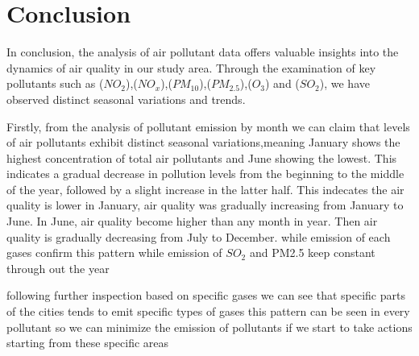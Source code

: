 \documentclass[]{article}
\begin{document}
\pagebreak
\section*{Conclusion}

In conclusion, the analysis of air pollutant data offers valuable insights into the dynamics of air quality in our study area. Through the examination of key pollutants such as ($NO_2$),($NO_x$),($PM_{10}$),($PM_{2.5}$),($O_3$) and ($SO_2$), we have observed distinct seasonal variations and trends. 

Firstly, from the analysis of pollutant emission by month we can claim that levels of air pollutants exhibit distinct seasonal variations,meaning January shows the highest concentration of total air pollutants and June showing the lowest. This indicates a gradual decrease in pollution levels from the beginning to the middle of the year, followed by a slight increase in the latter half. This indecates the air quality is lower in January, air quality was gradually increasing from January to June. In June, air quality become higher than any month in year. Then air quality is gradually
decreasing from July to December. while emission of each gases confirm this pattern while emission of $SO_2$ and PM2.5 keep constant through out the year

following further inspection based on specific gases we can see that specific parts of the cities tends to emit specific types of gases this pattern can be seen in every pollutant so we can minimize the emission of pollutants if we start to take actions starting from these specific areas
\end{document}
